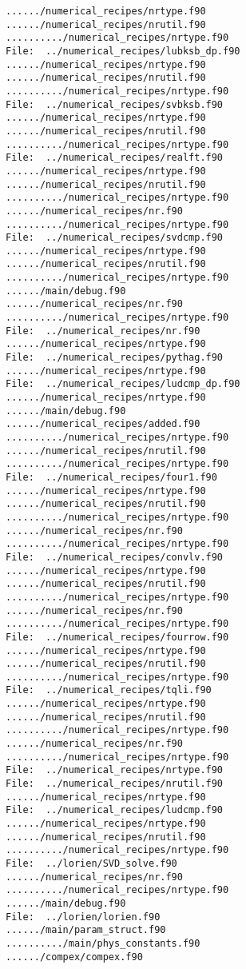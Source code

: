 \begin{verbatim}
....../numerical_recipes/nrtype.f90
....../numerical_recipes/nrutil.f90
........../numerical_recipes/nrtype.f90
File:  ../numerical_recipes/lubksb_dp.f90
....../numerical_recipes/nrtype.f90
....../numerical_recipes/nrutil.f90
........../numerical_recipes/nrtype.f90
File:  ../numerical_recipes/svbksb.f90
....../numerical_recipes/nrtype.f90
....../numerical_recipes/nrutil.f90
........../numerical_recipes/nrtype.f90
File:  ../numerical_recipes/realft.f90
....../numerical_recipes/nrtype.f90
....../numerical_recipes/nrutil.f90
........../numerical_recipes/nrtype.f90
....../numerical_recipes/nr.f90
........../numerical_recipes/nrtype.f90
File:  ../numerical_recipes/svdcmp.f90
....../numerical_recipes/nrtype.f90
....../numerical_recipes/nrutil.f90
........../numerical_recipes/nrtype.f90
....../main/debug.f90
....../numerical_recipes/nr.f90
........../numerical_recipes/nrtype.f90
File:  ../numerical_recipes/nr.f90
....../numerical_recipes/nrtype.f90
File:  ../numerical_recipes/pythag.f90
....../numerical_recipes/nrtype.f90
File:  ../numerical_recipes/ludcmp_dp.f90
....../numerical_recipes/nrtype.f90
....../main/debug.f90
....../numerical_recipes/added.f90
........../numerical_recipes/nrtype.f90
....../numerical_recipes/nrutil.f90
........../numerical_recipes/nrtype.f90
File:  ../numerical_recipes/four1.f90
....../numerical_recipes/nrtype.f90
....../numerical_recipes/nrutil.f90
........../numerical_recipes/nrtype.f90
....../numerical_recipes/nr.f90
........../numerical_recipes/nrtype.f90
File:  ../numerical_recipes/convlv.f90
....../numerical_recipes/nrtype.f90
....../numerical_recipes/nrutil.f90
........../numerical_recipes/nrtype.f90
....../numerical_recipes/nr.f90
........../numerical_recipes/nrtype.f90
File:  ../numerical_recipes/fourrow.f90
....../numerical_recipes/nrtype.f90
....../numerical_recipes/nrutil.f90
........../numerical_recipes/nrtype.f90
File:  ../numerical_recipes/tqli.f90
....../numerical_recipes/nrtype.f90
....../numerical_recipes/nrutil.f90
........../numerical_recipes/nrtype.f90
....../numerical_recipes/nr.f90
........../numerical_recipes/nrtype.f90
File:  ../numerical_recipes/nrtype.f90
File:  ../numerical_recipes/nrutil.f90
....../numerical_recipes/nrtype.f90
File:  ../numerical_recipes/ludcmp.f90
....../numerical_recipes/nrtype.f90
....../numerical_recipes/nrutil.f90
........../numerical_recipes/nrtype.f90
File:  ../lorien/SVD_solve.f90
....../numerical_recipes/nr.f90
........../numerical_recipes/nrtype.f90
....../main/debug.f90
File:  ../lorien/lorien.f90
....../main/param_struct.f90
........../main/phys_constants.f90
....../compex/compex.f90

\end{verbatim}
